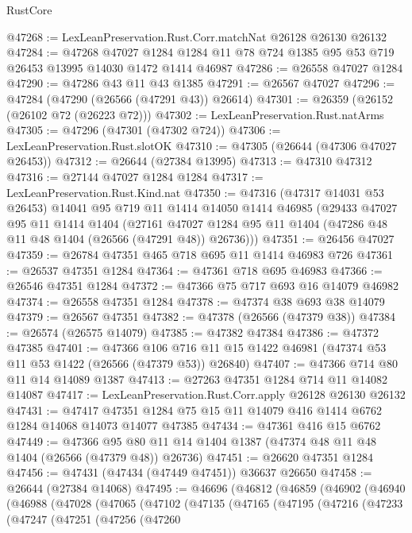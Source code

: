 \begin{lexlean}{RustCore}
\begin{coremodule}
@47268 := LexLeanPreservation.Rust.Corr.matchNat @26128 @26130 @26132
@47284 := @47268
    @47027
    @1284
    @1284
    @11
    @78
    @724
    @1385
    @95
    @53
    @719
    @26453
    @13995
    @14030
    @1472
    @1414
    @46987
@47286 := @26558 @47027 @1284
@47290 := @47286 @43 @11 @43 @1385
@47291 := @26567 @47027
@47296 := @47284 (@47290 (@26566 (@47291 @43)) @26614)
@47301 := @26359 (@26152 (@26102 @72 (@26223 @72)))
@47302 := LexLeanPreservation.Rust.natArms
@47305 := @47296 (@47301 (@47302 @724))
@47306 := LexLeanPreservation.Rust.slotOK
@47310 := @47305 (@26644 (@47306 @47027 @26453))
@47312 := @26644 (@27384 @13995)
@47313 := @47310 @47312
@47316 := @27144 @47027 @1284 @1284
@47317 := LexLeanPreservation.Rust.Kind.nat
@47350 := @47316
    (@47317 @14031 @53 @26453)
    @14041
    @95
    @719
    @11
    @1414
    @14050
    @1414
    @46985
    (@29433
      @47027
      @95
      @11
      @1414
      @1404
      (@27161 @47027 @1284 @95 @11 @1404 (@47286 @48 @11 @48 @1404 (@26566 (@47291 @48)) @26736)))
@47351 := @26456 @47027
@47359 := @26784 @47351 @465 @718 @695 @11 @1414 @46983 @726
@47361 := @26537 @47351 @1284
@47364 := @47361 @718 @695 @46983
@47366 := @26546 @47351 @1284
@47372 := @47366 @75 @717 @693 @16 @14079 @46982
@47374 := @26558 @47351 @1284
@47378 := @47374 @38 @693 @38 @14079
@47379 := @26567 @47351
@47382 := @47378 (@26566 (@47379 @38))
@47384 := @26574 (@26575 @14079)
@47385 := @47382 @47384
@47386 := @47372 @47385
@47401 := @47366
    @106
    @716
    @11
    @15
    @1422
    @46981
    (@47374 @53 @11 @53 @1422 (@26566 (@47379 @53)) @26840)
@47407 := @47366 @714 @80 @11 @14 @14089 @1387
@47413 := @27263 @47351 @1284 @714 @11 @14082 @14087
@47417 := LexLeanPreservation.Rust.Corr.apply @26128 @26130 @26132
@47431 := @47417 @47351 @1284 @75 @15 @11 @14079 @416 @1414 @6762 @1284 @14068 @14073 @14077 @47385
@47434 := @47361 @416 @15 @6762
@47449 := @47366 @95 @80 @11 @14 @1404 @1387 (@47374 @48 @11 @48 @1404 (@26566 (@47379 @48)) @26736)
@47451 := @26620 @47351 @1284
@47456 := @47431 (@47434 (@47449 @47451)) @36637 @26650
@47458 := @26644 (@27384 @14068)
@47495 := @46696
    (@46812
      (@46859
        (@46902
          (@46940
            (@46988
              (@47028
                (@47065
                  (@47102
                    (@47135
                      (@47165
                        (@47195
                          (@47216
                            (@47233
                              (@47247
                                (@47251
                                  (@47256
                                    (@47260

\end{coremodule}
\end{lexlean}
